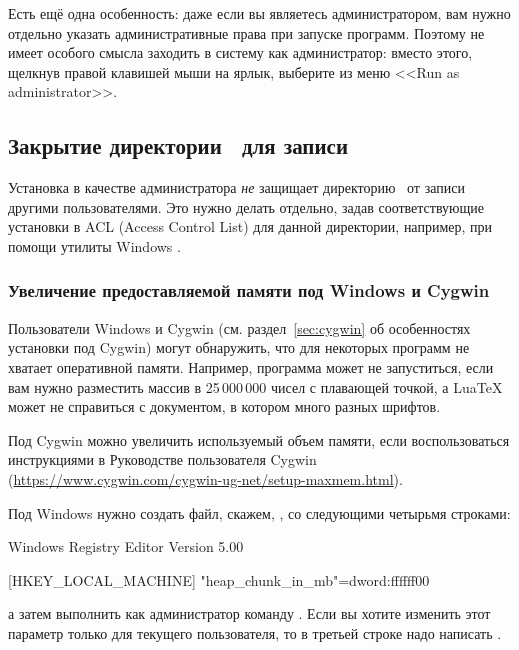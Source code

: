 \documentclass{article}
\begin{document}
Есть ещё одна особенность: даже если вы являетесь
администратором, вам нужно отдельно указать административные права при
запуске программ.  Поэтому не имеет особого смысла заходить в систему
как администратор: вместо этого, щелкнув правой клавишей мыши на
ярлык, выберите из меню <<Run as administrator>>.

\subsection{Закрытие директории \TL\ для записи}

Установка в качестве администратора \emph{не} защищает директорию \TL\
от записи другими пользователями.  Это нужно делать отдельно, задав
соответствующие установки в ACL (Access Control List) для
данной директории, например, при помощи утилиты Windows
.



\subsubsection{Увеличение предоставляемой памяти под Windows и Cygwin}
\label{sec:cygwin-maxmem}

Пользователи Windows и Cygwin (см. раздел~\ref{sec:cygwin} об
особенностях установки под Cygwin) могут обнаружить, что для
некоторых программ \TL{} не хватает оперативной памяти.  Например,
программа \prog{asy} может не запуститься, если вам нужно разместить
массив в  25\,000\,000 чисел с плавающей точкой, а Lua\TeX{} может не
справиться с документом, в котором много разных шрифтов.  

Под Cygwin можно увеличить используемый объем памяти, если
воспользоваться инструкциями в Руководстве пользователя Cygwin
(\url{https://www.cygwin.com/cygwin-ug-net/setup-maxmem.html}).

Под Windows нужно создать файл, скажем, , со
следующими четырьмя строками:

\begin{sverbatim}
Windows Registry Editor Version 5.00

[HKEY_LOCAL_MACHINE\Software\Cygwin]
"heap_chunk_in_mb"=dword:ffffff00
\end{sverbatim}

\noindent а затем выполнить как администратор команду \code{regedit /s
  moremem.reg}.  Если вы хотите изменить этот параметр только для
текущего пользователя, то в третьей строке надо написать
. 
\end{document}
